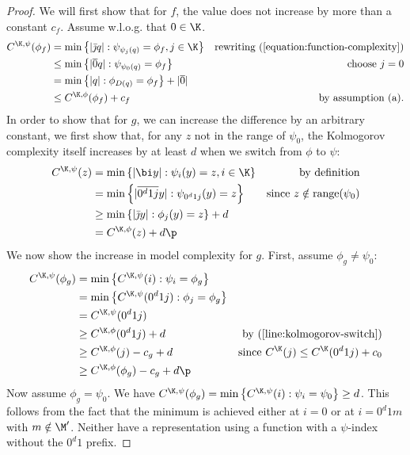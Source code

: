 \begin{proof}
We will first show that for $f$, the value does not increase by more than a constant $c_f$. Assume w.l.o.g. that $0 \in \K$.
\begin{align*}
C^{\K, \psi}(\phi_f) &= \min\left\{|\bar \jmath q| : \psi_{\psi_j(q)} = \phi_f, j \in \K \right\} & \text{rewriting (\ref{equation:function-complexity})} \\
&\leq \min \left\{ |\overline{0} q| : \psi_{\psi_0(q)} = \phi_f \right\}& \text{choose $j=0$} \\
&= \min \left\{ |q| : \phi_{D(q)} = \phi_f \right\} + |\overline{0}| \\
&\leq C^{\K, \phi}(\phi_f) + c_f & \text{by assumption (a).}
\end{align*}
In order to show that for $g$, we can increase the difference by an arbitrary constant, we first show that, for any $z$ not in the range of $\psi_0$, the Kolmogorov complexity itself increases by at least $d$ when we switch from $\phi$ to $\psi$:
\begin{align}
C^{\K, \psi}(z) &= \min\left\{|\bi y| : \psi_i(y) = z, i \in \K \right\} & \text{by definition}\nonumber\\
&= \min\left\{|\overline{0^d1j} y| : \psi_{0^d1j}(y) = z \right\} & \text{since $z\notin \text{range}(\psi_0)$} \nonumber\\
&\geq \min\left\{|\bar \jmath y| : \phi_{j}(y) = z \right\} + d &\nonumber\\
&= C^{\K, \phi}(z) + d\p & \label{line:kolmogorov-switch}
\end{align}
We now show the increase in model complexity for $g$. First, assume $\phi_g \neq \psi_0$:
\begin{align*}
C^{\K,\psi}(\phi_g) &= \min \left\{C^{\K, \psi}(i) : \psi_i = \phi_g \right\} \\
&= \min \left\{C^{\K, \psi}(0^d1j) : \phi_j = \phi_g \right\} \\
&= C^{\K, \psi}(0^d1j) \\
&\geq C^{\K,\phi}(0^d1j) + d & \text{by (\ref{line:kolmogorov-switch})} \\
&\geq C^{\K,\phi}(j) - c_g + d &\text{since $C^\K(j) \leq C^\K(0^d1j) + c_0$}\\
&\geq C^{\K, \phi}(\phi_g) - c_g + d \p
\end{align*}
Now assume $\phi_g = \psi_0$. We have $C^{\K,\psi}(\phi_g) = \min\left\{C^{\K, \psi}(i) : \psi_i = \psi_0 \right\} \geq d$. This follows from the fact that the minimum is achieved either at $i = 0$ or at $i = 0^d1m$ with $m \notin \M'$. Neither have a representation using a function with a $\psi$-index without the $0^d1$ prefix.


\end{proof}

